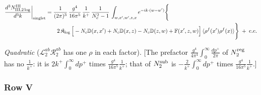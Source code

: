 \documentclass[9pt]{article}
\def\mf#1{\mathbb{#1}}
\numberwithin{equation}{section}
\begin{document}
{\begin{align}
\frac{d^{3}N^{\rm III}_{{\rm III},2\log}}{d^{3}k}\bigg|_{\rm singlet}&=\frac{1}{(2\pi)^{3}}\,\frac{g^{4}}{16\pi^{5}}\,\frac{1}{k^{+}}\,\frac{1}{N_{c}^{2}-1}\,\int_{w,x',w',z,x}e^{-ik\cdot(w-w')}\Bigg\{\notag\\
&\qquad 2\,\mathfrak{K}_{\log}\,\Big[-N_{c}\mf{D}(x,x')+N_{c}\mf{D}(x,z)-N_{c}\mf{D}(z,w)+\mf{F}(x',z,w)\Big]\,\langle\rho^{f}(x')\rho^{f}(x)\rangle\Bigg\}\;+\;{\rm c.c.}\label{eq:s-III-III-2log}
\end{align}

\emph{Quadratic} ($\mathcal{L}^{ab}_{2}\mathcal{R}^{ab}_{2}$ has one $\rho$ in each factor). [The prefactor $\frac{g^{4}}{4\pi^{4}}\int_{0}^{\infty}\frac{dp^{+}}{2\pi}$ of $N_{2}^{\rm reg}$ has no $\frac{1}{k^{+}}$: it is $2k^{+}\int_{0}^{\infty}dp^{+}$ times $\frac{g^{4}}{16\pi^{5}}\frac{1}{k^{+}}$; that of $N_{2}^{\rm sub}$ is $-\frac{2}{k^{+}}\int_{0}^{\infty}dp^{+}$ times $\frac{g^{4}}{16\pi^{5}}\frac{1}{k^{+}}$.]
\subsubsection*{Row V}

}
\end{document}

